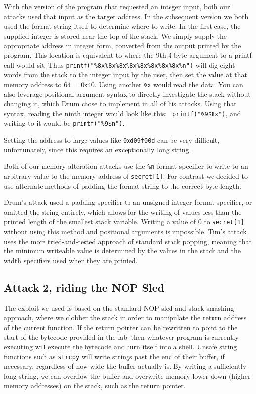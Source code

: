 With the version of the program that requested an integer input, both our attacks used that input as the target address.
In the subsequent version we both used the format string itself to determine where to write. In the first case, the
supplied integer is stored near the top of the stack. We simply supply the appropriate address in integer form,
converted from the output printed by the program. This location is equivalent to where the 9th 4-byte argument to a
printf call would sit. Thus {\tt printf("\%8x\%8x\%8x\%8x\%8x\%8x\%8x\%8x\%n")} will dig eight words from the stack to
the integer input by the user, then set the value at that memory address to 64 = 0x40. Using another {\tt\%x} would read
the data. You can also leverage positional argument syntax to directly investigate the stack without changing it, which
Drum chose to implement in all of his attacks. Using that syntax, reading the ninth integer would look like this: {\tt
printf("\%9\$8x")}, and writing to it would be {\tt printf("\%9\$n")}.

Setting the address to large values like {\tt 0xd09f00d} can be very difficult, unfortunately, since this requires an
exceptionally long string.

Both of our memory alteration attacks use the {\tt \%n} format specifier to write to an arbitrary value to the memory
address of {\tt secret[1]}. For contrast we decided to use alternate methods of padding the format string to the correct
byte length.

Drum's attack used a padding specifier to an unsigned integer format specifier, or omitted the string entirely, which
allows for the writing of values less than the printed length of the smallest stack variable. Writing a value of 0 to
{\tt secret[1]} without using this method and positional arguments is impossible. Tim's attack uses the more
tried-and-tested approach of standard stack popping, meaning that the minimum writeable value is determined by the
values in the stack and the width specifiers used when they are printed.

\subsection{Attack 2, riding the NOP Sled}

The exploit we used is based on the standard NOP sled and stack smashing approach, where we clobber the stack in order
to manipulate the return address of the current function. If the return pointer can be rewritten to point to the start
of the bytecode provided in the lab, then whatever program is currently executing will execute the bytecode and turn
itself into a shell. Unsafe string functions such as {\tt strcpy} will write strings past the end of their buffer, if
necessary, regardless of how wide the buffer actually is. By writing a sufficiently long string, we can overflow the
buffer and overwrite memory lower down (higher memory addresses) on the stack, such as the return pointer.


